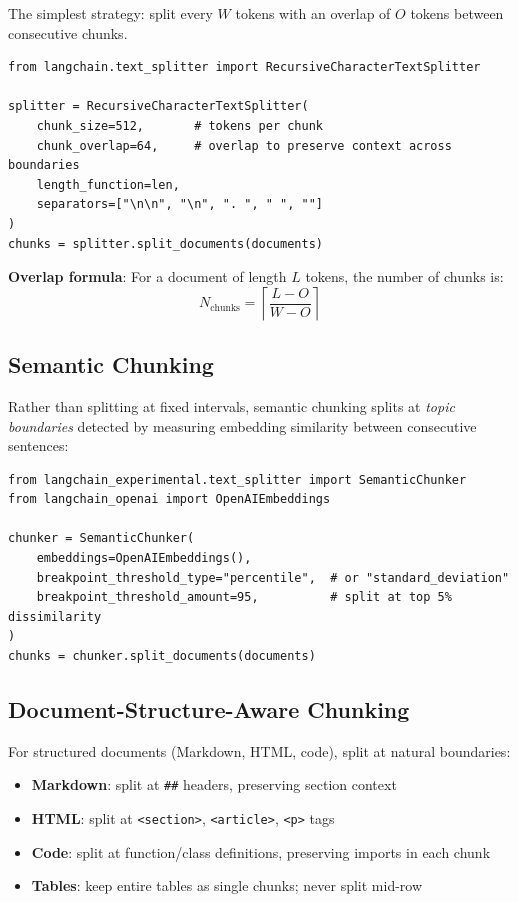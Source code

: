 The simplest strategy: split every $W$ tokens with an overlap of $O$ tokens between consecutive chunks.

\begin{lstlisting}[style=pythonstyle, caption={Fixed-size chunking with overlap}]
from langchain.text_splitter import RecursiveCharacterTextSplitter

splitter = RecursiveCharacterTextSplitter(
    chunk_size=512,       # tokens per chunk
    chunk_overlap=64,     # overlap to preserve context across boundaries
    length_function=len,
    separators=["\n\n", "\n", ". ", " ", ""]
)
chunks = splitter.split_documents(documents)
\end{lstlisting}

\textbf{Overlap formula}: For a document of length $L$ tokens, the number of chunks is: 
\begin{equation}
  N_{\text{chunks}} = \left\lceil \frac{L - O}{W - O} \right\rceil
\end{equation}

\subsection{Semantic Chunking}
\label{semantic-chunking}

Rather than splitting at fixed intervals, semantic chunking splits at \emph{topic boundaries} detected by measuring embedding similarity between consecutive sentences:

\begin{lstlisting}[style=pythonstyle, caption={Semantic chunking via embedding similarity}]
from langchain_experimental.text_splitter import SemanticChunker
from langchain_openai import OpenAIEmbeddings

chunker = SemanticChunker(
    embeddings=OpenAIEmbeddings(),
    breakpoint_threshold_type="percentile",  # or "standard_deviation"
    breakpoint_threshold_amount=95,          # split at top 5% dissimilarity
)
chunks = chunker.split_documents(documents)
\end{lstlisting}

\subsection{Document-Structure-Aware Chunking}
\label{document-structure-aware-chunking}

For structured documents (Markdown, HTML, code), split at natural boundaries:

\begin{itemize}
  \item \textbf{Markdown}: split at \texttt{\#\#} headers, preserving section context
  \item \textbf{HTML}: split at \texttt{<section>}, \texttt{<article>}, \texttt{<p>} tags
  \item \textbf{Code}: split at function/class definitions, preserving imports in each chunk
  \item \textbf{Tables}: keep entire tables as single chunks; never split mid-row
\end{itemize}

